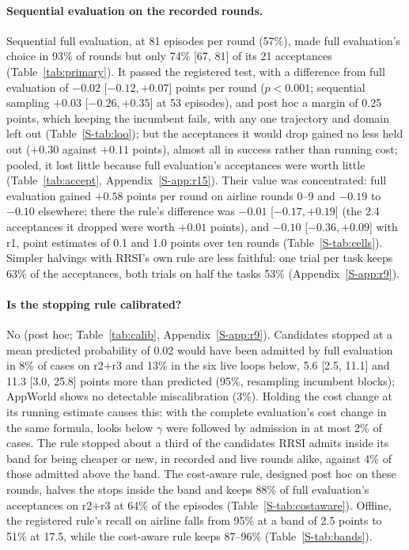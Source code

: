 \documentclass[11pt]{article}
\begin{document}
\paragraph{Sequential evaluation on the recorded rounds.} Sequential full evaluation, at 81 episodes per round (57\%), made full evaluation's choice in 93\% of rounds but only 74\% [67, 81] of its 21 acceptances (Table~\ref{tab:primary}). It passed the registered test, with a difference from full evaluation of $-0.02$ [$-0.12,+0.07$] points per round ($p<0.001$; sequential sampling $+0.03$ [$-0.26,+0.35$] at 53 episodes), and post hoc a margin of 0.25 points, which keeping the incumbent fails, with any one trajectory and domain left out (Table~\ref*{S-tab:loo}); but the acceptances it would drop gained no less held out ($+0.30$ against $+0.11$ points), almost all in success rather than running cost; pooled, it lost little because full evaluation's acceptances were worth little (Table~\ref{tab:accept}, Appendix~\ref*{S-app:r15}). Their value was concentrated: full evaluation gained $+0.58$ points per round on airline rounds 0--9 and $-0.19$ to $-0.10$ elsewhere; there the rule's difference was $-0.01$ [$-0.17,+0.19$] (the 2.4 acceptances it dropped were worth $+0.01$ points), and $-0.10$ [$-0.36,+0.09$] with r1, point estimates of 0.1 and 1.0 points over ten rounds (Table~\ref*{S-tab:cells}). Simpler halvings with RRSI's own rule are less faithful: one trial per task keeps 63\% of the acceptances, both trials on half the tasks 53\% (Appendix~\ref*{S-app:r9}).

\paragraph{Is the stopping rule calibrated?} No (post hoc; Table~\ref{tab:calib}, Appendix~\ref*{S-app:r9}). Candidates stopped at a mean predicted probability of 0.02 would have been admitted by full evaluation in 8\% of cases on r2+r3 and 13\% in the six live loops below, 5.6 [2.5, 11.1] and 11.3 [3.0, 25.8] points more than predicted (95\%, resampling incumbent blocks); AppWorld shows no detectable miscalibration (3\%). Holding the cost change at its running estimate causes this: with the complete evaluation's cost change in the same formula, looks below $\gamma$ were followed by admission in at most 2\% of cases. The rule stopped about a third of the candidates RRSI admits inside its band for being cheaper or new, in recorded and live rounds alike, against 4\% of those admitted above the band. The cost-aware rule, designed post hoc on these rounds, halves the stops inside the band and keeps 88\% of full evaluation's acceptances on r2+r3 at 64\% of the episodes (Table~\ref*{S-tab:costaware}). Offline, the registered rule's recall on airline falls from 95\% at a band of 2.5 points to 51\% at 17.5, while the cost-aware rule keeps 87--96\% (Table~\ref*{S-tab:bands}).
\end{document}
